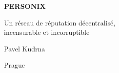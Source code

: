 \thispagestyle{empty}
\begin{center}
  {\sffamily\bfseries\fontsize{34}{40}\selectfont PERSONIX\par}
  \vspace{2.2em}
  {\rmfamily\large Un réseau de réputation décentralisé,\\[0.25em]
   incensurable et incorruptible\par}
\end{center}
\begin{center}
  {\rmfamily\Large Pavel Kudrna\par}
  \vspace{0.45em}
  {\rmfamily\small Prague\quad\textbullet{}\par}
\end{center}
\clearpage
